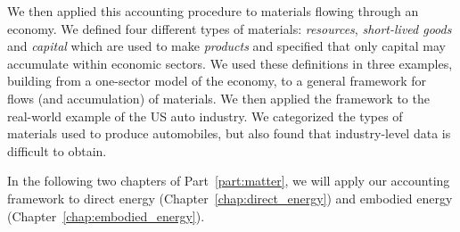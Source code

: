 We then applied this accounting procedure to materials 
flowing through an economy. 
We defined four different types of materials: \emph{resources},
\emph{short-lived goods} and \emph{capital} which are used to make
\emph{products} and specified that only capital 
may accumulate within economic sectors.
We used these definitions in three examples,
building from a one-sector model of the economy,
to a general framework for flows (and accumulation) of materials.
We then applied the framework to the real-world example of
the US auto industry.
We categorized the types of materials used to produce
automobiles,
but also found that industry-level data is difficult to obtain.

In the following two chapters of Part~\ref{part:matter},
we will apply our accounting framework 
to direct energy (Chapter~\ref{chap:direct_energy})
and embodied energy (Chapter~\ref{chap:embodied_energy}).







%
%


